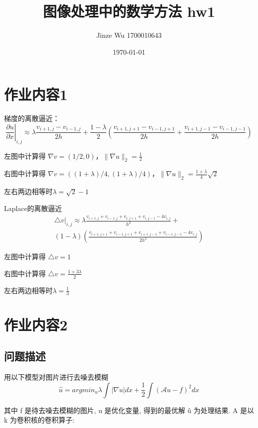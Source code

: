 \documentclass[withoutpreface,bwprint]{cumcmthesis}
\title{图像处理中的数学方法 hw1}
\date{\today}
\author{Jinze Wu 1700010643}
\begin{document}
\maketitle

\section{作业内容1}
梯度的离散逼近：
\begin{equation}
\left.\frac{\partial u}{\partial x}\right|_{i,j}\approx \lambda \frac{v_{i+1,j}-v_{i-1,j}}{2h}+
\frac{1-\lambda}{2}(\frac{v_{i+1,j+1}-v_{i-1,j+1}}{2h}+\frac{v_{i+1,j-1}-v_{i-1,j-1}}{2h})
\end{equation}

左图中计算得
$ \nabla v=(1/2,0)$，$\lVert \nabla u \rVert_{2}=\frac{1}{2}$

右图中计算得
$\nabla v=((1+\lambda)/4,(1+\lambda)/4)$，$\lVert \nabla u \rVert_{2}=\frac{1+\lambda}{4}\sqrt{2}$

左右两边相等时$\lambda=\sqrt{2}-1$

Laplace的离散逼近
\begin{equation}
\begin{split}
\left.\triangle v\right|_{i,j}\approx \lambda \frac{v_{i+1,j}+v_{i-1,j}+v_{i,j+1}+v_{i,j-1}-4v_{i,j}}{h^{2}}+\\
(1-\lambda)(\frac{v_{i+1,j+1}+v_{i-1,j+1}+v_{i+1,j-1}+v_{i-1,j-1}-4v_{i,j}}{2h^{2}})
\end{split}
\end{equation}

左图中计算得
$ \triangle v=1$

右图中计算得
$\triangle v=\frac{1+3\lambda}{2}$

左右两边相等时$\lambda=\frac{1}{3}$

\section{作业内容2}
\subsection{问题描述}
用以下模型对图片进行去噪去模糊
\begin{equation}
\hat{u}=argmin_{u}\lambda \int \lvert \nabla u\rvert dx+\frac{1}{2}\int (\mathcal{A}u-f)^{2}dx
\end{equation}

其中 f 是待去噪去模糊的图片, u 是优化变量, 得到的最优解 û 为处理结果. A 是以 k
为卷积核的卷积算子:
\end{document}
